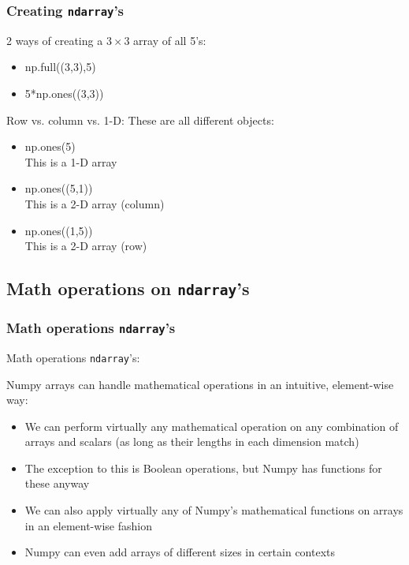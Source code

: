 \documentclass{beamer}
\newcommand{\code}[1]{\texttt{#1}}
\begin{document}
\begin{frame}	
	\frametitle{Creating \code{ndarray}'s}
	
	\begin{exampleblock}{2 ways of creating a $3\times3$ array of all 5's:}
		\begin{itemize}
			\item np.full((3,3),5)
			\item 5*np.ones((3,3))
		\end{itemize}
	\end{exampleblock}
	
	\begin{exampleblock}{Row vs. column vs. 1-D:}
		These are all different objects:
		\begin{itemize}
			\item np.ones(5) \\
					This is a 1-D array
			\item np.ones((5,1)) \\
					This is a 2-D array (column)
			\item np.ones((1,5)) \\
					This is a 2-D array (row)
		\end{itemize}
	\end{exampleblock}
	
\end{frame}

\subsection{Math operations on \code{ndarray}'s}

\begin{frame}	
	\frametitle{Math operations \code{ndarray}'s}
	
	\begin{block}{Math operations \code{ndarray}'s:}
		
		Numpy arrays can handle mathematical operations in an intuitive, element-wise way:
		\begin{itemize}
			\item We can perform virtually any mathematical operation on any combination of arrays and scalars (as long as their lengths in each dimension match)
			\item The exception to this is Boolean operations, but Numpy has functions for these anyway
			\item We can also apply virtually any of Numpy's mathematical functions on arrays in an element-wise fashion
			\item Numpy can even add arrays of different sizes in certain contexts
		\end{itemize}
	\end{block}
	
\end{frame}
\end{document}
